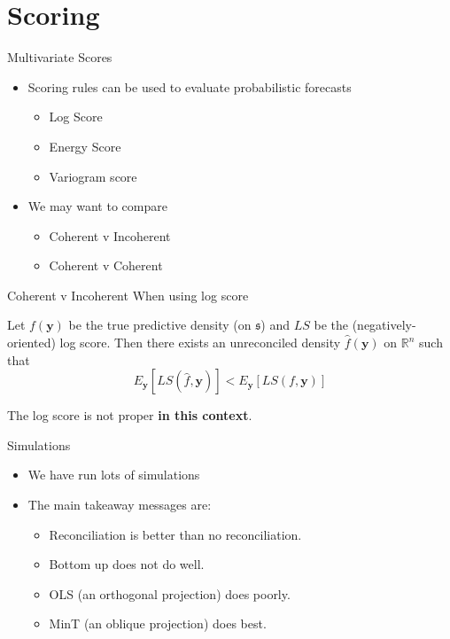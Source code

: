 \documentclass[handout]{beamer}
\begin{document}
  \section{Scoring}
  \begin{frame}{Multivariate Scores}
    \begin{itemize}
    \item Scoring rules can be used to evaluate probabilistic forecasts
        \begin{itemize}
	      \item Log Score
	      \item Energy Score
	      \item Variogram score
        \end{itemize}
    \item We may want to compare
    \begin{itemize}
    	\item Coherent v Incoherent
    	\item Coherent v Coherent
    \end{itemize}
    \end{itemize}
  \end{frame}
  \begin{frame}{Coherent v Incoherent}
	When using log score
	\begin{theorem}
		Let $f(\bm{y})$ be the true predictive density (on $\mathfrak{s}$) and $LS$ be the (negatively-oriented) log score.  Then there exists an unreconciled density  $\hat{f}(\bm{y})$ on $\mathbb{R}^n$ such that
		\begin{equation*}
		E_{\bm y}\left[LS(\hat{f},\bm{y})\right]<E_{\bm y}\left[LS(f,\bm{y})\right]
		\end{equation*}
	\end{theorem}
    The log score is not proper {\bf in this context}.
  \end{frame}
  \begin{frame}{Simulations}
   	\begin{itemize}
   		\item We have run lots of simulations
   		\item The main takeaway messages are:
   		    \begin{itemize}
   		    	\item Reconciliation is better than no reconciliation.
   		    	\item Bottom up does not do well.
   		    	\item OLS (an orthogonal projection) does poorly.
   		    	\item MinT (an oblique projection) does best.
   		    \end{itemize} 
   	\end{itemize}
   \end{frame}
\end{document}
